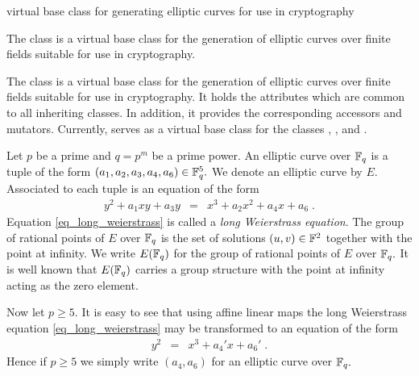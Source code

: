 


\NAME

\dotfill 
virtual base class for generating elliptic curves for use in cryptography



\ABSTRACT

The class  is a virtual base class
for the generation of elliptic curves over finite fields suitable for use
in cryptography.



\DESCRIPTION

The class  is a virtual base class
for the generation of elliptic curves over finite fields suitable for use
in cryptography. It holds the attributes which are common
to all inheriting classes. In addition, it provides
the corresponding accessors and mutators. Currently,
 serves as a virtual base class for the
classes ,
, and
.

Let $p$ be a prime and $q=p^m$ be a prime power. An
elliptic curve over $\mathbb{F}_q$ is a tuple of the form
$(a_1,a_2,a_3,a_4,a_6)\in\mathbb{F}_q^5.$ We denote
an elliptic curve by $E.$ Associated
to each tuple is an equation of the form
\begin{eqnarray}\label{eq_long_weierstrass}
y^2+a_1xy+a_3y & = & x^3 + a_2x^2 + a_4x+a_6\; .
\end{eqnarray}
Equation \eqref{eq_long_weierstrass} is called
a \emph{long Weierstrass equation}. The group of rational
points of $E$ over $\mathbb{F}_q$ is the set of solutions $(u,v)\in\mathbb{F}^2$
together with the point at infinity. We write
$E(\mathbb{F}_q)$ for the group of rational points of $E$ over
$\mathbb{F}_q.$ It is well known that $E(\mathbb{F}_q)$ carries a group
structure with the point at infinity acting as the zero element.

Now let $p\geq 5.$ It is easy to see that using affine linear maps
the long Weierstrass
equation \eqref{eq_long_weierstrass} may be transformed
to an equation of the form
\begin{eqnarray}\label{eq_short_weierstrass_5}
y^2 & = & x^3 + a_4'x+a_6'\; .
\end{eqnarray}
Hence if $p\geq 5$ we simply write $(a_4,a_6)$ for an
elliptic curve over $\mathbb{F}_q.$

